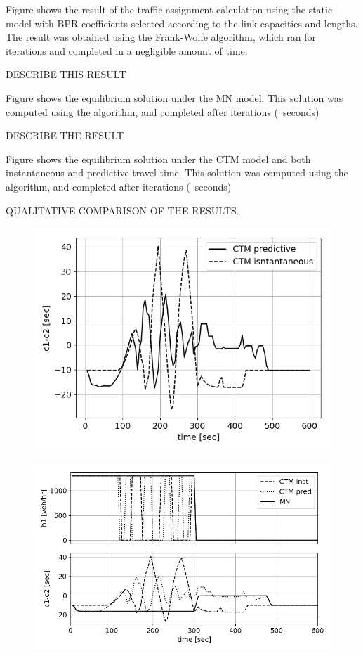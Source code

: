 Figure \XXX shows the result of the traffic assignment calculation using the static model with BPR coefficients selected according to the link capacities and lengths. The result was obtained using the Frank-Wolfe algorithm, which ran for \XXX iterations and completed in a negligible amount of time. 

DESCRIBE THIS RESULT

Figure \XXX shows the equilibrium solution under the MN model. This solution was computed using the \XXX algorithm, and completed after \XXX iterations (~\XXX seconds)

DESCRIBE THE RESULT

Figure \XXX shows the equilibrium solution under the CTM model and both instantaneous and predictive travel time. This solution was computed using the \XXX algorithm, and completed after \XXX iterations (~\XXX seconds)

QUALITATIVE COMPARISON OF THE RESULTS.


\begin{figure}[h]
    \centering
    \includegraphics[width=0.9\linewidth]{figs/cdiff_1300.png}
    \caption{\XXX }
    \label{fig:cdiff}
\end{figure}

\begin{figure}[h]
    \centering
    \includegraphics[width=\linewidth]{figs/ctm_vs_mn_hc.png}
    \caption{\XXX }
    \label{fig:ctm_vs_mn_hc}
\end{figure}

